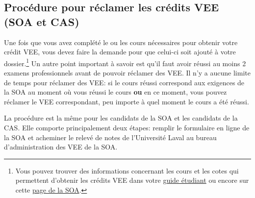 \newpage


\subsection*{Procédure pour réclamer les crédits VEE (SOA et CAS)}
\label{subsec:reclamvee}
Une fois que vous avez complété le ou les cours nécessaires pour obtenir votre crédit VEE, vous devez faire la demande pour que celui-ci soit ajouté à votre dossier.\footnote{Vous pouvez trouver des informations concernant les cours et les cotes qui permettent d'obtenir les crédits VEE dans votre \href{https://www.act.ulaval.ca/programmes-et-cours/premier-cycle/guide-de-letudiant/}{guide étudiant} ou encore sur cette \href{https://soa.org/Education/Exam-Req/Instructions-for-VEE-Directory.aspx}{page de la SOA}.} Un autre point important à savoir est qu'il faut avoir réussi au moins 2 examens professionnels avant de pouvoir réclamer des VEE. Il n'y a aucune limite de temps pour réclamer des VEE: si le cours réussi correspond aux exigences de la SOA au moment où vous réussi le cours \textbf{ou} en ce moment, vous pouvez réclamer le VEE correspondant, peu importe à quel moment le cours a été réussi.\vspace{\baselineskip} 

La procédure est la même pour les candidats de la SOA et les candidats de la CAS. Elle comporte principalement deux étapes: remplir le formulaire en ligne de la SOA et acheminer le relevé de notes de l'Université Laval au bureau d'administration des VEE de la SOA.\vspace{\baselineskip} 

